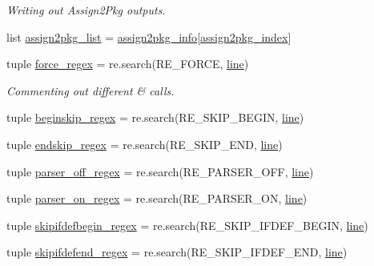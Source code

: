 \begin{DoxyCompactItemize}
\begin{DoxyCompactList}\small\item\em Writing out Assign2\-Pkg outputs. \end{DoxyCompactList}\item 
list \hyperlink{namespaceveripy_a069ecdd68f4a51cf7151b361b4159f4a}{assign2pkg\-\_\-list} = \hyperlink{namespaceveripy_a95394440df7568c06df836060d2c1f5e}{assign2pkg\-\_\-info}\mbox{[}\hyperlink{namespaceveripy_ae065d2f646ed5d1156a25bb21084cbd6}{assign2pkg\-\_\-index}\mbox{]}
\item 
tuple \hyperlink{namespaceveripy_af5876ef12bb1a85e8d8cd34cfafe054c}{force\-\_\-regex} = re.\-search(R\-E\-\_\-\-F\-O\-R\-C\-E, \hyperlink{namespaceveripy_a3cf9cf94513841f0d65d3081b08a55cc}{line})
\begin{DoxyCompactList}\small\item\em Commenting out different \& calls. \end{DoxyCompactList}\item 
tuple \hyperlink{namespaceveripy_a77acefbceb0478f3abeb04e6806324a2}{beginskip\-\_\-regex} = re.\-search(R\-E\-\_\-\-S\-K\-I\-P\-\_\-\-B\-E\-G\-I\-N, \hyperlink{namespaceveripy_a3cf9cf94513841f0d65d3081b08a55cc}{line})
\item 
tuple \hyperlink{namespaceveripy_a982e8b68ecc8da4b47d07fce69736f5c}{endskip\-\_\-regex} = re.\-search(R\-E\-\_\-\-S\-K\-I\-P\-\_\-\-E\-N\-D, \hyperlink{namespaceveripy_a3cf9cf94513841f0d65d3081b08a55cc}{line})
\item 
tuple \hyperlink{namespaceveripy_afcccb50dd7b0fb2b644b9c1d2323a3c1}{parser\-\_\-off\-\_\-regex} = re.\-search(R\-E\-\_\-\-P\-A\-R\-S\-E\-R\-\_\-\-O\-F\-F, \hyperlink{namespaceveripy_a3cf9cf94513841f0d65d3081b08a55cc}{line})
\item 
tuple \hyperlink{namespaceveripy_acaab00af25a2a159e2accd5ec9f5ddf2}{parser\-\_\-on\-\_\-regex} = re.\-search(R\-E\-\_\-\-P\-A\-R\-S\-E\-R\-\_\-\-O\-N, \hyperlink{namespaceveripy_a3cf9cf94513841f0d65d3081b08a55cc}{line})
\item 
tuple \hyperlink{namespaceveripy_a32070d26198948bdf028e393cb565ade}{skipifdefbegin\-\_\-regex} = re.\-search(R\-E\-\_\-\-S\-K\-I\-P\-\_\-\-I\-F\-D\-E\-F\-\_\-\-B\-E\-G\-I\-N, \hyperlink{namespaceveripy_a3cf9cf94513841f0d65d3081b08a55cc}{line})
\item 
tuple \hyperlink{namespaceveripy_a3e2775895f7dc417880c6298fcfbb5db}{skipifdefend\-\_\-regex} = re.\-search(R\-E\-\_\-\-S\-K\-I\-P\-\_\-\-I\-F\-D\-E\-F\-\_\-\-E\-N\-D, \hyperlink{namespaceveripy_a3cf9cf94513841f0d65d3081b08a55cc}{line})

\end{DoxyCompactItemize}
